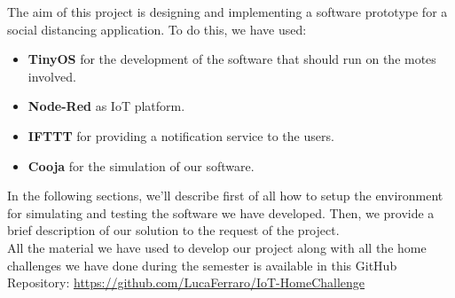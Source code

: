 
The aim of this project is designing and implementing a software prototype for a social distancing application.
To do this, we have used:
\begin{itemize}
    \item \textbf{TinyOS} for the development of the software that should run on the motes involved.
    \item \textbf{Node-Red} as IoT platform.
    \item \textbf{IFTTT} for providing a notification service to the users.
    \item \textbf{Cooja} for the simulation of our software. 
\end{itemize}

In the following sections, we'll describe first of all how to setup the environment for simulating and testing the software we
have developed. Then, we provide a brief description of our solution to the request of the project.\\ 
All the material we have used to develop our project along with all the home challenges we have done during the semester is 
available in this GitHub Repository: \textcolor{url_blue}{\url{https://github.com/LucaFerraro/IoT-HomeChallenge}}